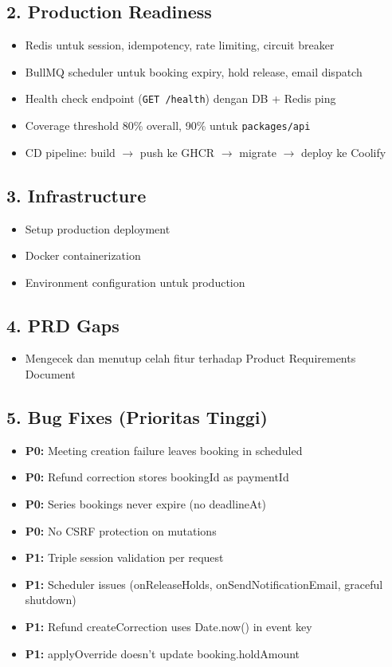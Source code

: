 \documentclass[11pt,a4paper]{article}
\begin{document}
\subsection*{2. Production Readiness}
\begin{itemize}
    \item Redis untuk session, idempotency, rate limiting, circuit breaker
    \item BullMQ scheduler untuk booking expiry, hold release, email dispatch
    \item Health check endpoint (\texttt{GET /health}) dengan DB + Redis ping
    \item Coverage threshold 80\% overall, 90\% untuk \texttt{packages/api}
    \item CD pipeline: build $\rightarrow$ push ke GHCR $\rightarrow$ migrate $\rightarrow$ deploy ke Coolify
\end{itemize}

\subsection*{3. Infrastructure}
\begin{itemize}
    \item Setup production deployment
    \item Docker containerization
    \item Environment configuration untuk production
\end{itemize}

\subsection*{4. PRD Gaps}
\begin{itemize}
    \item Mengecek dan menutup celah fitur terhadap Product Requirements Document
\end{itemize}

\subsection*{5. Bug Fixes (Prioritas Tinggi)}
\begin{itemize}
    \item \textbf{P0:} Meeting creation failure leaves booking in scheduled
    \item \textbf{P0:} Refund correction stores bookingId as paymentId
    \item \textbf{P0:} Series bookings never expire (no deadlineAt)
    \item \textbf{P0:} No CSRF protection on mutations
    \item \textbf{P1:} Triple session validation per request
    \item \textbf{P1:} Scheduler issues (onReleaseHolds, onSendNotificationEmail, graceful shutdown)
    \item \textbf{P1:} Refund createCorrection uses Date.now() in event key
    \item \textbf{P1:} applyOverride doesn't update booking.holdAmount
\end{itemize}
\end{document}
